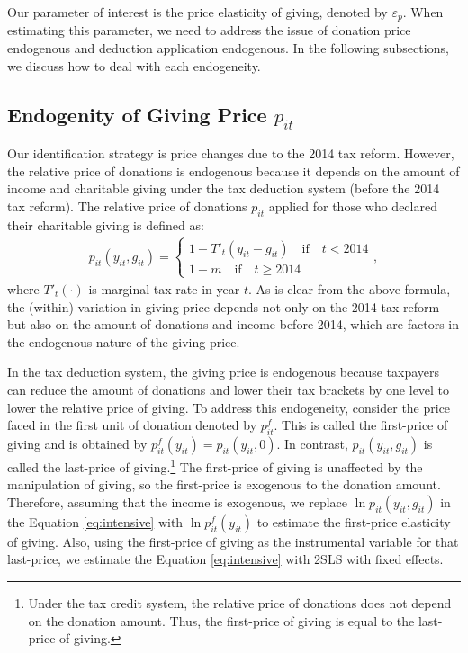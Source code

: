 \documentclass[
  11pt,
  a4paper,
]{article}
\begin{document}
Our parameter of interest is the price elasticity of giving, denoted by \(\varepsilon_p\).
When estimating this parameter,
we need to address the issue of donation price endogenous
and deduction application endogenous.
In the following subsections, we discuss how to deal with each endogeneity.

\hypertarget{endogenity-of-giving-price-p_it}{%
\subsection{\texorpdfstring{Endogenity of Giving Price \(p_{it}\)}{Endogenity of Giving Price p\_\{it\}}}\label{endogenity-of-giving-price-p_it}}

Our identification strategy is price changes due to the 2014 tax reform.
However, the relative price of donations is endogenous
because it depends on the amount of income and charitable giving under the tax deduction system (before the 2014 tax reform).
The relative price of donations \(p_{it}\) applied for those who declared their charitable giving is defined as:
\begin{align}
  p_{it}(y_{it}, g_{it}) =
  \begin{cases}
    1 - T'_t(y_{it} - g_{it})  \quad\text{if}\quad t < 2014  \\
    1 - m \quad\text{if}\quad t \ge 2014
  \end{cases}, \label{eq:price}
\end{align}
where \(T'_t(\cdot)\) is marginal tax rate in year \(t\).
As is clear from the above formula,
the (within) variation in giving price depends not only on the 2014 tax reform
but also on the amount of donations and income before 2014,
which are factors in the endogenous nature of the giving price.

In the tax deduction system,
the giving price is endogenous
because taxpayers can reduce the amount of donations and
lower their tax brackets by one level to lower the relative price of giving.
To address this endogeneity, consider the price faced in the first unit of donation denoted by \(p^f_{it}\).
This is called the first-price of giving and is obtained by \(p^f_{it}(y_{it}) = p_{it}(y_{it}, 0)\).
In contrast, \(p_{it}(y_{it}, g_{it})\) is called the last-price of giving.\footnote{Under the tax credit system, the relative price of donations does not depend on the donation amount. Thus, the first-price of giving is equal to the last-price of giving.}
The first-price of giving is unaffected by the manipulation of giving,
so the first-price is exogenous to the donation amount.
Therefore, assuming that the income is exogenous,
we replace \(\ln p_{it}(y_{it}, g_{it})\) in the Equation \eqref{eq:intensive} with \(\ln p^f_{it}(y_{it})\)
to estimate the first-price elasticity of giving.
Also, using the first-price of giving as the instrumental variable for that last-price,
we estimate the Equation \eqref{eq:intensive} with 2SLS with fixed effects.
\end{document}
